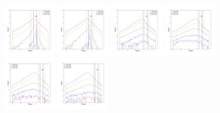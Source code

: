\documentclass[12pt,prd]{article}
\begin{document}
\begin{figure}[h!]
\includegraphics[width=0.24\textwidth]{../figures/scanning_plotsgaiascan_l101_2_b58_4_ra212_7_dec55_2_npy_11.pdf}
\includegraphics[width=0.24\textwidth]{../figures/scanning_plotsgaiascan_l101_2_b58_4_ra212_7_dec55_2_npy_12.pdf}
\includegraphics[width=0.24\textwidth]{../figures/scanning_plotsgaiascan_l101_2_b58_4_ra212_7_dec55_2_npy_13.pdf}
\includegraphics[width=0.24\textwidth]{../figures/scanning_plotsgaiascan_l101_2_b58_4_ra212_7_dec55_2_npy_14.pdf}
\includegraphics[width=0.24\textwidth]{../figures/scanning_plotsgaiascan_l101_2_b58_4_ra212_7_dec55_2_npy_15.pdf}
\includegraphics[width=0.24\textwidth]{../figures/scanning_plotsgaiascan_l101_2_b58_4_ra212_7_dec55_2_npy_16.pdf}

\end{figure}
\end{document}
